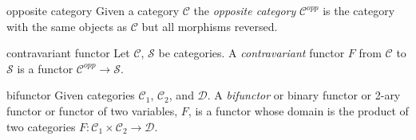 \begin{frame}
\begin{block}{opposite category}
Given a category $\mathcal{C}$ the {\it opposite category}
$\mathcal{C}^{opp}$ is the category with the same objects
as $\mathcal{C}$ but all morphisms reversed.
\end{block}
\begin{block}{contravariant functor}
Let $\mathcal{C}$, $\mathcal{S}$ be categories.
A {\it contravariant} functor $F$
from $\mathcal{C}$ to $\mathcal{S}$
is a functor $\mathcal{C}^{opp}\to \mathcal{S}$.
\end{block}
\begin{block}{bifunctor}
Given categories $\mathcal{C}_1$, $\mathcal{C}_2$, and $\mathcal{D}$. A {\it bifunctor} or binary functor or 2-ary functor or functor of two variables, $F$, is a functor whose domain is the product of two categories $F: \mathcal{C}_1 \times \mathcal{C}_2 \rightarrow \mathcal{D}$.
\end{block}
\end{frame}